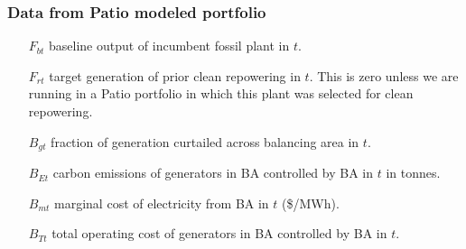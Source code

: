 \documentclass[9pt, oneside]{article}
\numberwithin{equation}{subsubsection}
\begin{document}
\begin{multicols}{2}
	\subsubsection{Data from Patio modeled portfolio}
	{\small
		\begin{itemize}
			\item[$F_{bt}$] baseline output of incumbent fossil plant in $t$.
			\item[$F_{rt}$] target generation of prior clean repowering in $t$.
			      This is zero unless we are running in a Patio portfolio in which this plant was selected for clean repowering.
			\item[$B_{gt}$] fraction of generation curtailed across balancing area in $t$.
			\item[$B_{Et}$] carbon emissions of generators in BA controlled by BA in $t$ in tonnes.
			\item[$B_{mt}$] marginal cost of electricity from BA in $t$ (\$/MWh).
			\item[$B_{Tt}$] total operating cost of generators in BA controlled by BA in $t$.
		\end{itemize}
	}
\end{multicols}
\end{document}

